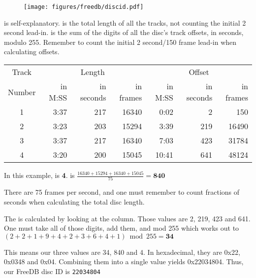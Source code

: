 \begin{figure}[h]
\texttt{[image: figures/freedb/discid.pdf]}
\end{figure}
\par
\noindent
{} is self-explanatory.
 is the total length of all the tracks, not
counting the initial 2 second lead-in.
 is the sum of the digits of all
the disc's track offsets, in seconds, modulo 255.
Remember to count the initial 2 second/150 frame lead-in when calculating
offsets.
\begin{table}[h]
\begin{tabular}{|c||r|r|r||r|r|r|}
\hline
Track & \multicolumn{3}{c||}{Length} & \multicolumn{3}{c|}{Offset} \\
Number & in M:SS & in seconds & in frames & in M:SS & in seconds & in frames \\
\hline
1 & 3:37 & 217 & 16340 & 0:02 & 2 & 150 \\
2 & 3:23 & 203 & 15294 & 3:39 & 219 & 16490 \\
3 & 3:37 & 217 & 16340 & 7:03 & 423 & 31784 \\
4 & 3:20 & 200 & 15045 & 10:41 & 641 & 48124 \\
\hline
\end{tabular}
\end{table}
\par
\noindent
In this example,  is \textbf{4}.
 is
$\frac{16340 + 15294 + 16340 + 15045}{75} = \textbf{840}$

There are 75 frames per second, and one must remember to count
fractions of seconds when calculating the total disc length.

The  is calculated by looking at the
 column.
Those values are 2, 219, 423 and 641.
One must take all of those digits, add them, and mod 255 which works out to
$(2 + 2 + 1 + 9 + 4 + 2 + 3 + 6 + 4 + 1) \bmod 255 = \textbf{34}$

This means our three values are 34, 840 and 4.
In hexadecimal, they are 0x22, 0x0348 and 0x04.
Combining them into a single value yields 0x22034804.
Thus, our FreeDB disc ID is \texttt{22034804}

\clearpage

